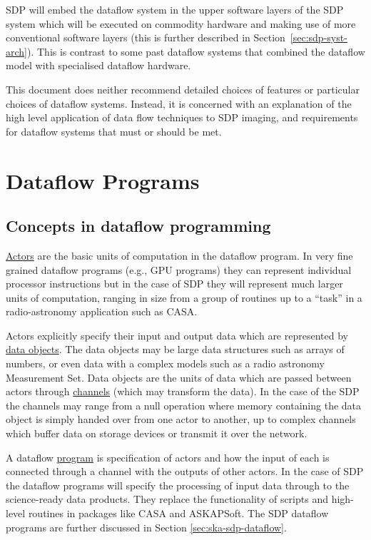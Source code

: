 \documentclass[11pt,a4paper]{article}
\begin{document}
SDP will embed the dataflow system in the upper software layers of the
SDP system which will be executed on commodity hardware and making use
of more conventional software layers (this is further described in
Section~\ref{sec:sdp-syst-arch}). This is contrast to some past
dataflow systems that combined the dataflow model with specialised
dataflow hardware.

This document does neither recommend detailed choices of features or
particular choices of dataflow systems.  Instead, it is concerned with
an explanation of the high level application of data flow techniques
to SDP imaging, and requirements for dataflow systems that must or
should be met.

\section{Dataflow Programs}
\label{sec:dataflow-programs}
\subsection{Concepts in dataflow programming}

\underline{Actors} are the basic units of computation in the dataflow
program. In very fine grained dataflow programs (e.g., GPU programs)
they can represent individual processor instructions but in the case
of SDP they will represent much larger units of computation, ranging
in size from a group of routines up to a ``task'' in a radio-astronomy
application such as CASA.  

Actors explicitly specify their input and output data which are
represented by \underline{data objects}. The data objects may be large
data structures such as arrays of numbers, or even data with a complex
models such as a radio astronomy Measurement Set. Data objects are the
units of data which are passed between actors through
\underline{channels} (which may transform the data). In the case of
the SDP the channels may range from a null operation where memory
containing the data object is simply handed over from one actor to
another, up to complex channels which buffer data on storage devices
or transmit it over the network.

A dataflow \underline{program} is specification of actors and how the
input of each is connected through a channel with the outputs of other
actors. In the case of SDP the dataflow programs will specify the
processing of input data through to the science-ready data
products. They replace the functionality of scripts and high-level
routines in packages like CASA and ASKAPSoft. The SDP dataflow
programs are further discussed in Section \ref{sec:ska-sdp-dataflow}.
\end{document}
